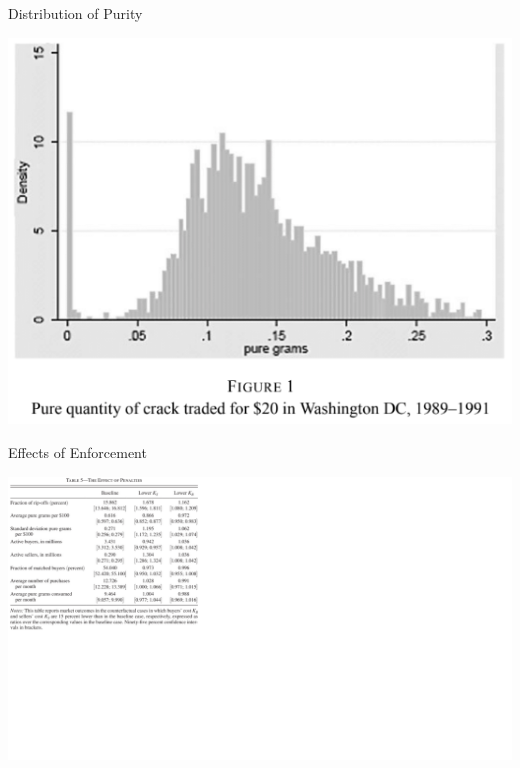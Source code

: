 \documentclass[10pt,ignorenonframetext,]{beamer}
\begin{document}
\begin{frame}{Distribution of Purity}
\protect\hypertarget{distribution-of-purity}{}

\includegraphics{Figure1.png}

\end{frame}

\begin{frame}{Effects of Enforcement}
\protect\hypertarget{effects-of-enforcement}{}

\includegraphics[width=2.5\textwidth,height=\textheight]{Figure3.png}

\end{frame}
\end{document}
